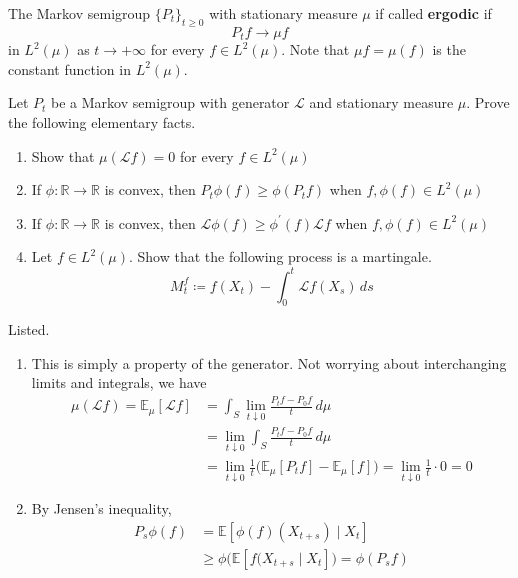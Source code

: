 \documentclass{article}
\begin{document}
  \begin{definition}[Ergodicity]
  The Markov semigroup $\{P_t\}_{t \geq 0}$ with stationary measure $\mu$ if called \textbf{ergodic} if 
  \[P_t f \rightarrow \mu f\]
  in $L^2 (\mu)$ as $t \rightarrow +\infty$ for every $f \in L^2 (\mu)$. Note that $\mu f = \mu(f)$ is the constant function in $L^2 (\mu)$. 
  \end{definition}

  \begin{exercise}
  Let $P_t$ be a Markov semigroup with generator $\mathscr{L}$ and stationary measure $\mu$. Prove the following elementary facts. 
  \begin{enumerate}
      \item Show that $\mu( \mathscr{L} f) = 0$ for every $f \in L^2 (\mu)$ 
      \item If $\phi : \mathbb{R} \rightarrow \mathbb{R}$ is convex, then $P_t \phi (f) \geq \phi (P_t f)$ when $f, \phi(f) \in L^2(\mu)$ 
      \item If $\phi : \mathbb{R} \rightarrow \mathbb{R}$ is convex, then $\mathscr{L} \phi(f) \geq \phi^\prime (f) \mathscr{L} f$ when $f, \phi(f) \in L^2 (\mu)$ 
      \item Let $f \in L^2 (\mu)$. Show that the following process is a martingale. 
      \[M_t^f \coloneqq f(X_t) - \int_0^t \mathscr{L} f(X_s) \,ds\]
  \end{enumerate}
  \end{exercise}
  \begin{solution}
  Listed. 
  \begin{enumerate}
      \item This is simply a property of the generator. Not worrying about interchanging limits and integrals, we have 
      \begin{align*}
          \mu(\mathscr{L} f) = \mathbb{E}_\mu [\mathscr{L} f] & = \int_S \lim_{t \downarrow 0} \frac{P_t f - P_0 f}{t} \,d\mu \\ 
          & = \lim_{t \downarrow 0} \int_S \frac{P_t f - P_0 f}{t} \,d\mu \\
          & = \lim_{t \downarrow 0} \frac{1}{t} \big( \mathbb{E}_\mu [P_t f] - \mathbb{E}_\mu [f] \big) = \lim_{t \downarrow 0} \frac{1}{t} \cdot 0 = 0 
      \end{align*}
      
      \item By Jensen's inequality, 
      \begin{align*}
          P_s \phi(f) & = \mathbb{E} [ \phi(f) (X_{t + s}) \mid X_t] \\
          & \geq \phi \bigg( \mathbb{E}[f(X_{t + s} \mid X_t] \big) = \phi(P_s f)
      \end{align*}

  \end{enumerate}
  \end{solution}
\end{document}
